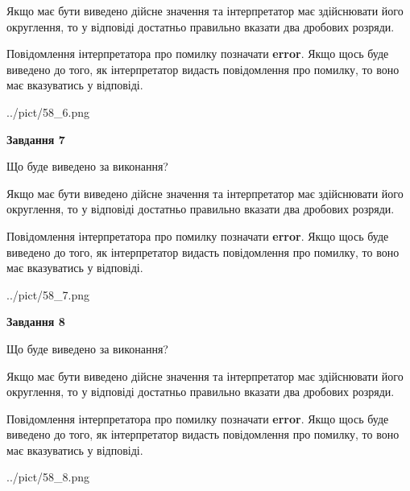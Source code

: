 \documentclass[12pt, ukrainian]{article}
\begin{document}
{\begin {Large}
Якщо має бути виведено дійсне значення та інтерпретатор має здійснювати його округлення, 
то у відповіді достатньо правильно вказати два дробових розряди.

Повідомлення інтерпретатора про помилку позначати \textbf{error}.
Якщо щось буде виведено до того, як інтерпретатор видасть повідомлення про помилку, 
то воно має вказуватись у відповіді. \par

\begin{center}
	{../pict/58_6.png}
\end{center}
\newpage

{\begin {center}\textbf{Завдання 7}\end {center}}\par
Що буде виведено за виконання? \par

Якщо має бути виведено дійсне значення та інтерпретатор має здійснювати його округлення, 
то у відповіді достатньо правильно вказати два дробових розряди.

Повідомлення інтерпретатора про помилку позначати \textbf{error}.
Якщо щось буде виведено до того, як інтерпретатор видасть повідомлення про помилку, 
то воно має вказуватись у відповіді. \par

\begin{center}
	{../pict/58_7.png}
\end{center}
\newpage

{\begin {center}\textbf{Завдання 8}\end {center}}\par
Що буде виведено за виконання? \par

Якщо має бути виведено дійсне значення та інтерпретатор має здійснювати його округлення, 
то у відповіді достатньо правильно вказати два дробових розряди.

Повідомлення інтерпретатора про помилку позначати \textbf{error}.
Якщо щось буде виведено до того, як інтерпретатор видасть повідомлення про помилку, 
то воно має вказуватись у відповіді. \par

\begin{center}
	{../pict/58_8.png}
\end{center}
\newpage


\end{Large}}
\end{document}

